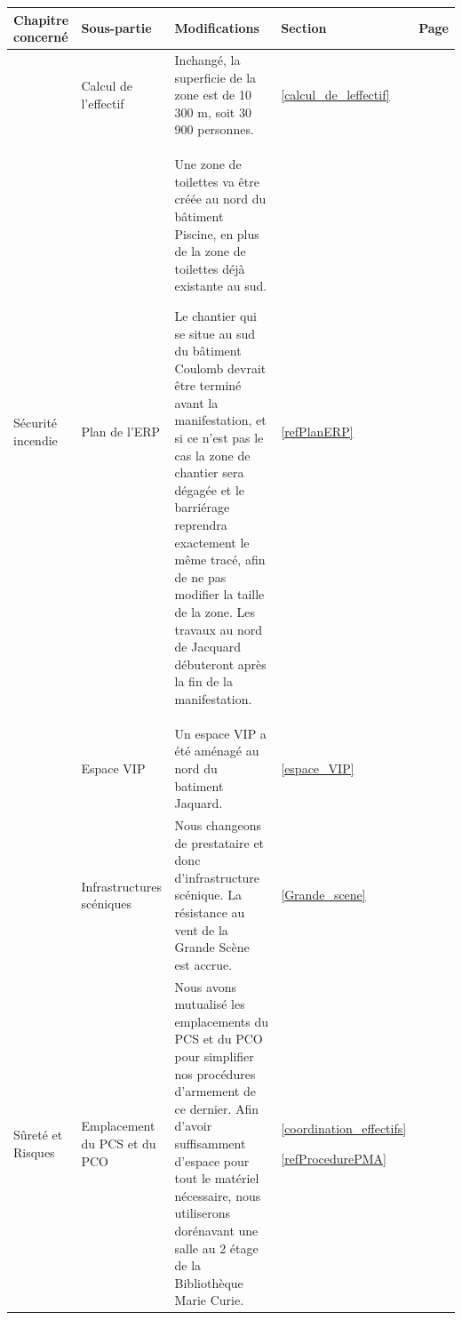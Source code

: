 \documentclass[hidelinks, paper=a4, fontsize=13pt]{report}
\begin{document}
\setlength{\aboverulesep}{0pt}
\setlength{\belowrulesep}{0pt}
\setlength{\extrarowheight}{.75ex}
\begin{tabular}{|m{}|m{}|m{}|m{}|m{}|} \toprule
\cellcolor[gray]{0.9} \centering\textbf{Chapitre concerné} & \cellcolor[gray]{0.9} \centering\textbf{Sous-partie} & \cellcolor[gray]{0.9} \centering\textbf{Modifications} & \cellcolor[gray]{0.9} \centering\textbf{Section}& \cellcolor[gray]{0.9} \textbf{Page}\\ \midrule
 & Calcul de l'effectif & Inchangé, la superficie de la zone est de 10 300 m\up{2}, soit 30 900 personnes. & \ref{calcul_de_leffectif}&\pageref{calcul_de_leffectif}\\
\cmidrule{2-5}
\vspace{1.5cm}
Sécurité incendie & Plan de l'ERP & 	Une zone de toilettes va être créée au nord du bâtiment Piscine, en plus de la zone de toilettes déjà existante au sud. 

Le chantier qui se situe au sud du bâtiment Coulomb devrait être terminé avant la manifestation, et si ce n'est pas le cas la zone de chantier sera dégagée et le barriérage reprendra exactement le même tracé, afin de ne pas modifier la taille de la zone. Les travaux au nord de Jacquard débuteront après la fin de la manifestation.& \ref{refPlanERP}&\pageref{refPlanERP}\\
\cmidrule{2-5}
& Espace VIP & Un espace VIP a été aménagé au nord du batiment Jaquard. & \ref{espace_VIP}&\pageref{espace_VIP}\\
\cmidrule{2-5}
& Infrastructures scéniques & Nous changeons de prestataire et donc d'infrastructure scénique. La résistance au vent de la Grande Scène est accrue. & \ref{Grande_scene}&\pageref{Grande_scene}\\
\midrule
\vspace{1.8cm}
Sûreté et Risques & Emplacement du PCS et du PCO & Nous avons mutualisé les emplacements du PCS et du PCO pour simplifier nos procédures d'armement de ce dernier. Afin d'avoir suffisamment d'espace pour tout le matériel nécessaire, nous utiliserons dorénavant une salle au 2\up{ème} étage de la Bibliothèque Marie Curie. & \ref{coordination_effectifs}

\ref{refProcedurePMA}&\pageref{coordination_effectifs}


\end{tabular}
\end{document}
